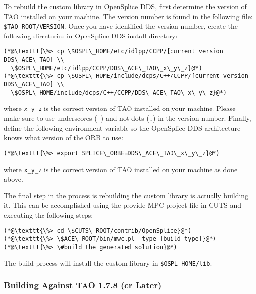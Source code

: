 To rebuild the custom library in OpenSplice DDS, first determine
the version of TAO installed on your machine. The version number is
found in the following file: \texttt{\$TAO\_ROOT/VERSION}. Once you
have identified the version number, create the following directories
in OpenSplice DDS install directory:
\begin{lstlisting}
(*@\texttt{\%> cp \$OSPL\_HOME/etc/idlpp/CCPP/[current version DDS\_ACE\_TAO] \\
  \$OSPL\_HOME/etc/idlpp/CCPP/DDS\_ACE\_TAO\_x\_y\_z}@*)
(*@\texttt{\%> cp \$OSPL\_HOME/include/dcps/C++/CCPP/[current version DDS\_ACE\_TAO] \\
  \$OSPL\_HOME/include/dcps/C++/CCPP/DDS\_ACE\_TAO\_x\_y\_z}@*)
\end{lstlisting}
where \texttt{x\_y\_z} is the correct version of TAO installed on your 
machine. Please make sure to use underscores (\texttt{\_}) and not 
dots (\texttt{.}) in the version number. Finally, define the following 
environment variable so the OpenSplice DDS architecture knows what 
version of the ORB to use:
\begin{lstlisting}
(*@\texttt{\%> export SPLICE\_ORBE=DDS\_ACE\_TAO\_x\_y\_z}@*)
\end{lstlisting}
where \texttt{x\_y\_z} is the correct version of TAO installed on 
your machine as done above.

The final step in the process is rebuilding the custom library is
actually building it. This can be accomplished using the provide
MPC project file in CUTS and executing the following steps: 
\begin{lstlisting}
(*@\texttt{\%> cd \$CUTS\_ROOT/contrib/OpenSplice}@*)
(*@\texttt{\%> \$ACE\_ROOT/bin/mwc.pl -type [build type]}@*)
(*@\texttt{\%> \#build the generated solution}@*)
\end{lstlisting}

The build process will install the custom library in 
\texttt{\$OSPL\_HOME/lib}.

\subsubsection{Building Against TAO 1.7.8 (or Later)}

